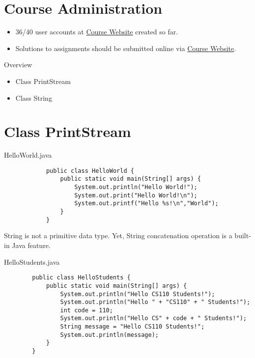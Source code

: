 \documentclass[10pt, compress]{beamer}
\begin{document}
\prepareCover

\section{Course Administration}

\begin{slide}
	\begin{itemize}
		\item[] 36/40 user accounts at \href{http://www.ghorbanzade.com}{Course Website} created so far.
		\item[] Solutions to assignments should be submitted online via \href{http://www.ghorbanzade.com}{Course Website}.
	\end{itemize}
\end{slide}

\begin{slide}
	\begin{block}{Overview}
		\begin{itemize}
			\item[] Class PrintStream
			\item[] Class String
		\end{itemize}
	\end{block}
\end{slide}

\section{Class PrintStream}

\begin{slide}
	\begin{block}{HelloWorld.java}
		\begin{verbatim}
			public class HelloWorld {
			    public static void main(String[] args) {
			        System.out.println("Hello World!");
			        System.out.print("Hello World!\n");
			        System.out.printf("Hello %s!\n","World");
			    }
			}
		\end{verbatim}
	\end{block}
\end{slide}

\begin{slide}
	String is not a primitive data type. Yet, String concatenation operation is a built-in Java feature.
	\begin{block}{HelloStudents.java}
	\begin{verbatim}
		public class HelloStudents {
		    public static void main(String[] args) {
		        System.out.println("Hello CS110 Students!");
		        System.out.println("Hello " + "CS110" + " Students!");
		        int code = 110;
		        System.out.println("Hello CS" + code + " Students!");
		        String message = "Hello CS110 Students!";
		        System.out.println(message);
		    }
		}
	\end{verbatim}
	\end{block}
\end{slide}
\end{document}
